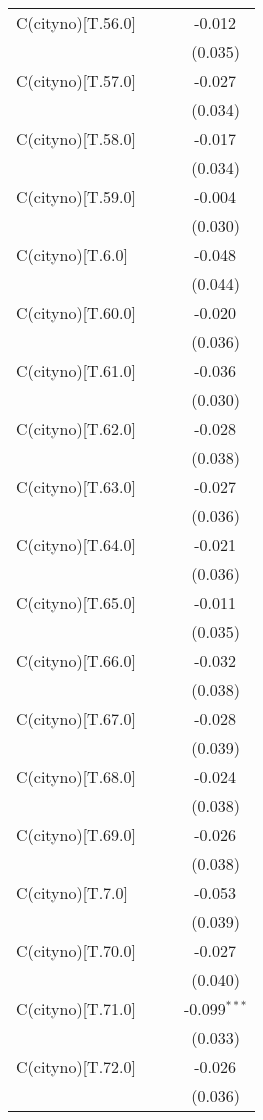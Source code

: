 \begin{table}[!htbp]
\begin{tabular}{@{\extracolsep{5pt}}lccc}
 C(cityno)[T.56.0] & & & -0.012$^{}$ \\
& & & (0.035) \\
 C(cityno)[T.57.0] & & & -0.027$^{}$ \\
& & & (0.034) \\
 C(cityno)[T.58.0] & & & -0.017$^{}$ \\
& & & (0.034) \\
 C(cityno)[T.59.0] & & & -0.004$^{}$ \\
& & & (0.030) \\
 C(cityno)[T.6.0] & & & -0.048$^{}$ \\
& & & (0.044) \\
 C(cityno)[T.60.0] & & & -0.020$^{}$ \\
& & & (0.036) \\
 C(cityno)[T.61.0] & & & -0.036$^{}$ \\
& & & (0.030) \\
 C(cityno)[T.62.0] & & & -0.028$^{}$ \\
& & & (0.038) \\
 C(cityno)[T.63.0] & & & -0.027$^{}$ \\
& & & (0.036) \\
 C(cityno)[T.64.0] & & & -0.021$^{}$ \\
& & & (0.036) \\
 C(cityno)[T.65.0] & & & -0.011$^{}$ \\
& & & (0.035) \\
 C(cityno)[T.66.0] & & & -0.032$^{}$ \\
& & & (0.038) \\
 C(cityno)[T.67.0] & & & -0.028$^{}$ \\
& & & (0.039) \\
 C(cityno)[T.68.0] & & & -0.024$^{}$ \\
& & & (0.038) \\
 C(cityno)[T.69.0] & & & -0.026$^{}$ \\
& & & (0.038) \\
 C(cityno)[T.7.0] & & & -0.053$^{}$ \\
& & & (0.039) \\
 C(cityno)[T.70.0] & & & -0.027$^{}$ \\
& & & (0.040) \\
 C(cityno)[T.71.0] & & & -0.099$^{***}$ \\
& & & (0.033) \\
 C(cityno)[T.72.0] & & & -0.026$^{}$ \\
& & & (0.036) \\

\end{tabular}
\end{table}
